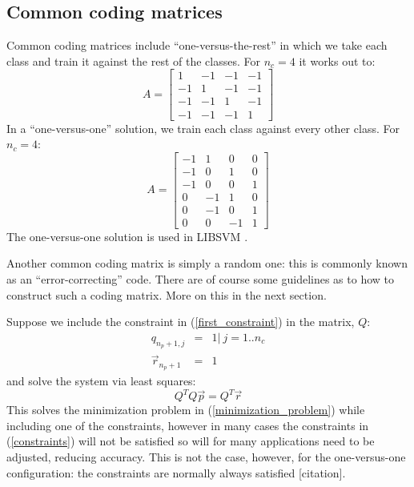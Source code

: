 \documentclass{article}
\begin{document}
\subsection{Common coding matrices}

Common coding matrices include ``one-versus-the-rest'' in which
we take each class and train it against the rest of the
classes.
For $n_c=4$ it works out to:
\begin{equation}
A = 
\begin{bmatrix}
1 & -1 & -1 & -1 \\
-1 & 1 & -1 & -1 \\
-1 & -1 & 1 & -1 \\
-1 & -1 & -1 & 1
\end{bmatrix}
\end{equation}
In a ``one-versus-one'' solution, we train each class against
every other class. For $n_c=4$:
\begin{equation}
A = 
\begin{bmatrix}
-1 & 1 & 0 & 0 \\
-1 & 0 & 1 & 0 \\
-1 & 0 & 0 & 1 \\
0 & -1 & 1 & 0 \\
0 & -1 & 0 & 1 \\
0 & 0 & -1 & 1
\end{bmatrix}
\end{equation}
The one-versus-one solution is used in LIBSVM \citep{Chang_Lin2011}.

Another common coding matrix is simply a random one: this is commonly
known as an ``error-correcting'' code. There are of course some guidelines
as to how to construct such a coding matrix. More on this in the next 
section.

Suppose we include the constraint in (\ref{first_constraint}) in the matrix, $Q$:
\begin{eqnarray}
	q_{n_p+1,j} & = & 1 |~ j=1..n_c \\
	\vec r_{n_p+1} & = & 1
\end{eqnarray}
and solve the system via least squares:
\begin{equation}
	Q^T Q \vec p = Q^T \vec r
\end{equation}
This solves the minimization problem in (\ref{minimization_problem}) while
including one of the constraints, however in many
cases the constraints in (\ref{constraints}) will not be satisfied so will
for many applications need to be adjusted, reducing accuracy.
This is not the case, however, for the one-versus-one configuration: the
constraints are normally always satisfied [citation].
\end{document}

